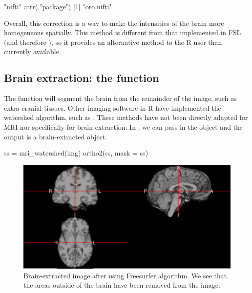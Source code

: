 \begin{Schunk}
\begin{Soutput}
[1] "nifti"
attr(,"package")
[1] "oro.nifti"
\end{Soutput}
\end{Schunk}

Overall, this correction is a way to make the intensities of the brain
more homogeneous spatially. This method is different from that
implemented in FSL \citep{jenkinson_fsl_2012} (and therefore
), so it provides an alternative method to the R user than
currently available.

\subsection{\texorpdfstring{Brain extraction: the 
function}{Brain extraction: the  function}}\label{brain-extraction-the-function}

The  function will segment the brain from the
remainder of the image, such as extra-cranial tissues. Other imaging
software in R have implemented the watershed algorithm, such as
 \citep{EBImage}. These methods have not been directly
adapted for MRI nor specifically for brain extraction. In
, we can pass in the  object and the output
is a brain-extracted  object.

\begin{Schunk}
\begin{Sinput}
ss = mri_watershed(img)
ortho2(ss, mask = ss)
\end{Sinput}
\end{Schunk}

\begin{Schunk}
\begin{figure}
\includegraphics{muschelli_files/figure-latex/watershed_plot-1} \caption[Brain-extracted image after using Freesurfer  algorithm]{Brain-extracted image after using Freesurfer  algorithm.  We see that the areas outside of the brain have been removed from the image.}\label{fig:watershed_plot}
\end{figure}
\end{Schunk}

